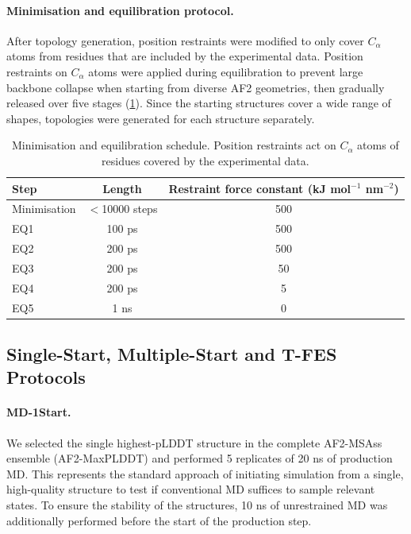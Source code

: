 \paragraph{Minimisation and equilibration protocol.}
After topology generation, position restraints were modified to only cover $C_\alpha$ atoms from residues that are included by the experimental data. Position restraints on $C_\alpha$ atoms were applied during equilibration to prevent large backbone collapse when starting from diverse AF2 geometries, then gradually released over five stages (\cref{tab:valdx-md-equilibration}). Since the starting structures cover a wide range of shapes, topologies were generated for each structure separately.

\begin{table}[htbp]
    \centering
    \small
    \begin{tabular}{lcc}
    \toprule
        \textbf{Step} & \textbf{Length} & \textbf{Restraint force constant (kJ mol$^{-1}$ nm$^{-2}$)} \\
        \midrule
        Minimisation & $<$10000 steps & 500 \\
        EQ1 & 100 ps & 500 \\
        EQ2 & 200 ps & 500 \\
        EQ3 & 200 ps & 50 \\
        EQ4 & 200 ps & 5 \\
        EQ5 & 1 ns & 0 \\
        \bottomrule
    \end{tabular}
    \caption{Minimisation and equilibration schedule. Position restraints act on $C_\alpha$ atoms of residues covered by the experimental data.}
    \label{tab:valdx-md-equilibration}
\end{table}

\subsection{Single-Start, Multiple-Start and T-FES Protocols}
\label{app:valdx-md-protocols}

\paragraph{MD-1Start.}
We selected the single highest-pLDDT structure in the complete AF2-MSAss ensemble (AF2-MaxPLDDT) and performed 5 replicates of 20 ns of production MD. This represents the standard approach of initiating simulation from a single, high-quality structure to test if conventional MD suffices to sample relevant states. To ensure the stability of the structures, 10 ns of unrestrained MD was additionally performed before the start of the production step.

